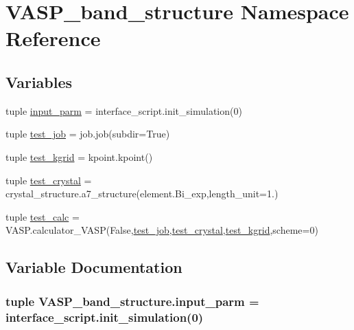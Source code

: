 \hypertarget{namespace_v_a_s_p__band__structure}{\section{V\+A\+S\+P\+\_\+band\+\_\+structure Namespace Reference}
\label{namespace_v_a_s_p__band__structure}
}
\subsection*{Variables}
\begin{DoxyCompactItemize}
\item 
tuple \hyperlink{namespace_v_a_s_p__band__structure_aebfe333a4327c4195f8bfc2ed8f576c2}{input\+\_\+parm} = interface\+\_\+script.\+init\+\_\+simulation(0)
\item 
tuple \hyperlink{namespace_v_a_s_p__band__structure_a0257c119debb1013e8d8cba8000d12f6}{test\+\_\+job} = job.\+job(subdir=True)
\item 
tuple \hyperlink{namespace_v_a_s_p__band__structure_a54971948e7b7b36e4afa8e29894a9a87}{test\+\_\+kgrid} = kpoint.\+kpoint()
\item 
tuple \hyperlink{namespace_v_a_s_p__band__structure_a3ba4ce987c572684aca44c2be79e8ff0}{test\+\_\+crystal} = crystal\+\_\+structure.\+a7\+\_\+structure(element.\+Bi\+\_\+exp,length\+\_\+unit=1.)
\item 
tuple \hyperlink{namespace_v_a_s_p__band__structure_a8f94831061241e002ee2f542e137426e}{test\+\_\+calc} = V\+A\+S\+P.\+calculator\+\_\+\+V\+A\+S\+P(False,\hyperlink{namespace_v_a_s_p__band__structure_a0257c119debb1013e8d8cba8000d12f6}{test\+\_\+job},\hyperlink{namespace_v_a_s_p__band__structure_a3ba4ce987c572684aca44c2be79e8ff0}{test\+\_\+crystal},\hyperlink{namespace_v_a_s_p__band__structure_a54971948e7b7b36e4afa8e29894a9a87}{test\+\_\+kgrid},scheme=0)
\end{DoxyCompactItemize}


\subsection{Variable Documentation}
\hypertarget{namespace_v_a_s_p__band__structure_aebfe333a4327c4195f8bfc2ed8f576c2}{
\subsubsection[{input\+\_\+parm}]{\setlength{\rightskip}{0pt plus 5cm}tuple V\+A\+S\+P\+\_\+band\+\_\+structure.\+input\+\_\+parm = interface\+\_\+script.\+init\+\_\+simulation(0)}}\label{namespace_v_a_s_p__band__structure_aebfe333a4327c4195f8bfc2ed8f576c2}


